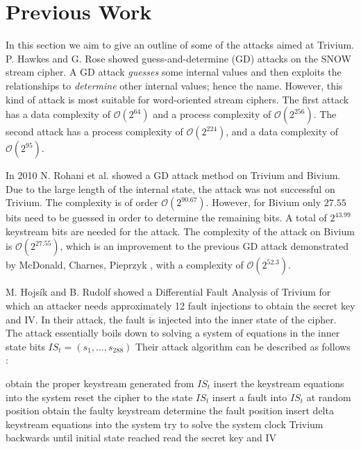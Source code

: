 \documentclass[conference]{IEEEtran}
\begin{document}
\section{Previous Work}\label{sec:previous-work}

In this section we aim to give an outline of some of the attacks aimed at Trivium. 
P. Hawkes and G. Rose showed guess-and-determine (GD) attacks on the SNOW stream cipher. A GD attack \textit{guesses} some internal values and then exploits the relationships to \textit{determine} other internal values; hence the name. However, this kind of attack is most suitable for word-oriented stream ciphers. The first attack has a data complexity of $\mathcal{O}(2^{64})$ and a process complexity of $\mathcal{O}(2^{256})$. The second attack has a process complexity of $\mathcal{O}(2^{224})$, and a data complexity of $\mathcal{O}(2^{95})$.\cite{Hawkes2003}

In 2010 N. Rohani et al. showed a GD attack method on Trivium and Bivium. \cite{Rohani2010} Due to the large length of the internal state, the attack was not successful on Trivium. The complexity is of order $\mathcal{O}(2^{90.67})$. However, for Bivium only $27.55$ bits need to be guessed in order to determine the remaining bits. A total of $2^{43.99}$ keystream bits are needed for the attack. The complexity of the attack on Bivium is $\mathcal{O}(2^{27.55})$, which is an improvement to the previous GD attack demonstrated by McDonald, Charnes, Pieprzyk \cite{biv-old}, with a complexity of $\mathcal{O}(2^{52.3})$.

M. Hojsík and B. Rudolf \cite{Hojsik2008} showed a Differential Fault Analysis of Trivium for which an attacker needs approximately 12 fault injections to obtain the secret key and IV. In their attack, the fault is injected into the inner state of the cipher. 
The attack essentially boils down to solving a system of equations in the inner state bits $IS_t = (s_1,\dots, s_{288})$
Their attack algorithm can be described as follows \cite{Hojsik2008}:
\begin{algorithmic}[1]
\State obtain the proper keystream generated from $IS_t$ 
\State insert the keystream equations into the system 
\State reset the cipher to the state $IS_t$
\State insert a fault into $IS_t$ at random position
\State obtain the faulty keystream
\State determine the fault position
\State insert delta keystream equations into the system
\State try to solve the system
\EndWhile
\State clock Trivium backwards until initial state reached
\State read the secret key and IV
\end{algorithmic}
\end{document}
